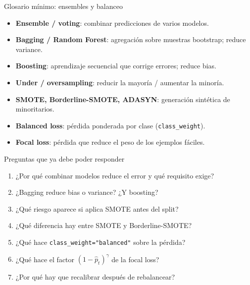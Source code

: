 \documentclass[aspectratio=169,12pt]{beamer}
\begin{document}
\begin{frame}{Glosario mínimo: ensembles y balanceo}
  \small
  \begin{itemize}
    \item \textbf{Ensemble / voting}: combinar predicciones de varios modelos.
    \item \textbf{Bagging / Random Forest}: agregación sobre muestras bootstrap; reduce variance.
    \item \textbf{Boosting}: aprendizaje secuencial que corrige errores; reduce bias.
    \item \textbf{Under / oversampling}: reducir la mayoría / aumentar la minoría.
    \item \textbf{SMOTE, Borderline-SMOTE, ADASYN}: generación sintética de minoritarios.
    \item \textbf{Balanced loss}: pérdida ponderada por clase (\texttt{class\_weight}).
    \item \textbf{Focal loss}: pérdida que reduce el peso de los ejemplos fáciles.
  \end{itemize}
\end{frame}

\begin{frame}{Preguntas que ya debe poder responder}
  \small
  \begin{enumerate}
    \item ¿Por qué combinar modelos reduce el error y qué requisito exige?
    \item ¿Bagging reduce bias o variance? ¿Y boosting?
    \item ¿Qué riesgo aparece si aplica SMOTE antes del split?
    \item ¿Qué diferencia hay entre SMOTE y Borderline-SMOTE?
    \item ¿Qué hace \texttt{class\_weight="balanced"} sobre la pérdida?
    \item ¿Qué hace el factor $(1 - \hat{p}_t)^\gamma$ de la focal loss?
    \item ¿Por qué hay que recalibrar después de rebalancear?
  \end{enumerate}
\end{frame}
\end{document}
